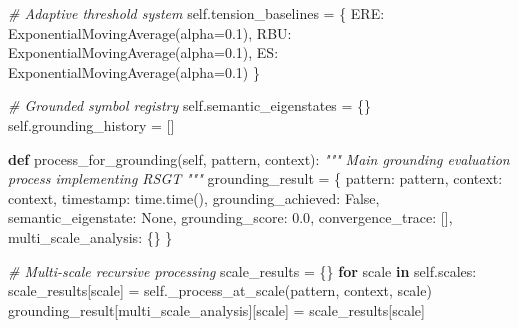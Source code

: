 \documentclass[
]{article}
\newenvironment{Shaded}{}{}
\newcommand{\CommentTok}[1]{\textcolor[rgb]{0.38,0.63,0.69}{\textit{#1}}}
\newcommand{\ControlFlowTok}[1]{\textcolor[rgb]{0.00,0.44,0.13}{\textbf{#1}}}
\newcommand{\FloatTok}[1]{\textcolor[rgb]{0.25,0.63,0.44}{#1}}
\newcommand{\KeywordTok}[1]{\textcolor[rgb]{0.00,0.44,0.13}{\textbf{#1}}}
\newcommand{\NormalTok}[1]{#1}
\newcommand{\OperatorTok}[1]{\textcolor[rgb]{0.40,0.40,0.40}{#1}}
\newcommand{\StringTok}[1]{\textcolor[rgb]{0.25,0.44,0.63}{#1}}
\newcommand{\VariableTok}[1]{\textcolor[rgb]{0.10,0.09,0.49}{#1}}
\begin{document}
\begin{Shaded}
\begin{Highlighting}[]
        \CommentTok{\# Adaptive threshold system}
        \VariableTok{self}\NormalTok{.tension\_baselines }\OperatorTok{=}\NormalTok{ \{}
            \StringTok{\textquotesingle{}ERE\textquotesingle{}}\NormalTok{: ExponentialMovingAverage(alpha}\OperatorTok{=}\FloatTok{0.1}\NormalTok{),}
            \StringTok{\textquotesingle{}RBU\textquotesingle{}}\NormalTok{: ExponentialMovingAverage(alpha}\OperatorTok{=}\FloatTok{0.1}\NormalTok{),}
            \StringTok{\textquotesingle{}ES\textquotesingle{}}\NormalTok{: ExponentialMovingAverage(alpha}\OperatorTok{=}\FloatTok{0.1}\NormalTok{)}
\NormalTok{        \}}

        \CommentTok{\# Grounded symbol registry}
        \VariableTok{self}\NormalTok{.semantic\_eigenstates }\OperatorTok{=}\NormalTok{ \{\}}
        \VariableTok{self}\NormalTok{.grounding\_history }\OperatorTok{=}\NormalTok{ []}

    \KeywordTok{def}\NormalTok{ process\_for\_grounding(}\VariableTok{self}\NormalTok{, pattern, context):}
        \CommentTok{"""}
\CommentTok{        Main grounding evaluation process implementing RSGT}
\CommentTok{        """}
\NormalTok{        grounding\_result }\OperatorTok{=}\NormalTok{ \{}
            \StringTok{\textquotesingle{}pattern\textquotesingle{}}\NormalTok{: pattern,}
            \StringTok{\textquotesingle{}context\textquotesingle{}}\NormalTok{: context,}
            \StringTok{\textquotesingle{}timestamp\textquotesingle{}}\NormalTok{: time.time(),}
            \StringTok{\textquotesingle{}grounding\_achieved\textquotesingle{}}\NormalTok{: }\VariableTok{False}\NormalTok{,}
            \StringTok{\textquotesingle{}semantic\_eigenstate\textquotesingle{}}\NormalTok{: }\VariableTok{None}\NormalTok{,}
            \StringTok{\textquotesingle{}grounding\_score\textquotesingle{}}\NormalTok{: }\FloatTok{0.0}\NormalTok{,}
            \StringTok{\textquotesingle{}convergence\_trace\textquotesingle{}}\NormalTok{: [],}
            \StringTok{\textquotesingle{}multi\_scale\_analysis\textquotesingle{}}\NormalTok{: \{\}}
\NormalTok{        \}}

        \CommentTok{\# Multi{-}scale recursive processing}
\NormalTok{        scale\_results }\OperatorTok{=}\NormalTok{ \{\}}
        \ControlFlowTok{for}\NormalTok{ scale }\KeywordTok{in} \VariableTok{self}\NormalTok{.scales:}
\NormalTok{            scale\_results[scale] }\OperatorTok{=} \VariableTok{self}\NormalTok{.\_process\_at\_scale(pattern, context, scale)}
\NormalTok{            grounding\_result[}\StringTok{\textquotesingle{}multi\_scale\_analysis\textquotesingle{}}\NormalTok{][scale] }\OperatorTok{=}\NormalTok{ scale\_results[scale]}


\end{Highlighting}
\end{Shaded}
\end{document}
